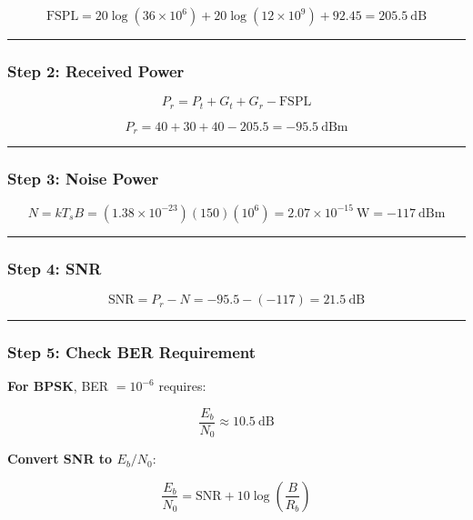 \[
\text{FSPL} = 20\log(36 \times 10^6) + 20\log(12 \times 10^9) + 92.45 = 205.5\ \text{dB}
\]

\begin{center}\rule{0.5\linewidth}{0.5pt}\end{center}

\subsubsection{Step 2: Received Power}\label{step-2-received-power}

\[
P_r = P_t + G_t + G_r - \text{FSPL}
\]

\[
P_r = 40 + 30 + 40 - 205.5 = -95.5\ \text{dBm}
\]

\begin{center}\rule{0.5\linewidth}{0.5pt}\end{center}

\subsubsection{Step 3: Noise Power}\label{step-3-noise-power}

\[
N = kT_sB = (1.38 \times 10^{-23})(150)(10^6) = 2.07 \times 10^{-15}\ \text{W} = -117\ \text{dBm}
\]

\begin{center}\rule{0.5\linewidth}{0.5pt}\end{center}

\subsubsection{Step 4: SNR}\label{step-4-snr}

\[
\text{SNR} = P_r - N = -95.5 - (-117) = 21.5\ \text{dB}
\]

\begin{center}\rule{0.5\linewidth}{0.5pt}\end{center}

\subsubsection{Step 5: Check BER
Requirement}\label{step-5-check-ber-requirement}

\textbf{For BPSK}, BER \(= 10^{-6}\) requires:

\[
\frac{E_b}{N_0} \approx 10.5\ \text{dB}
\]

\textbf{Convert SNR to \(E_b/N_0\)}:

\[
\frac{E_b}{N_0} = \text{SNR} + 10\log\left(\frac{B}{R_b}\right)
\]


